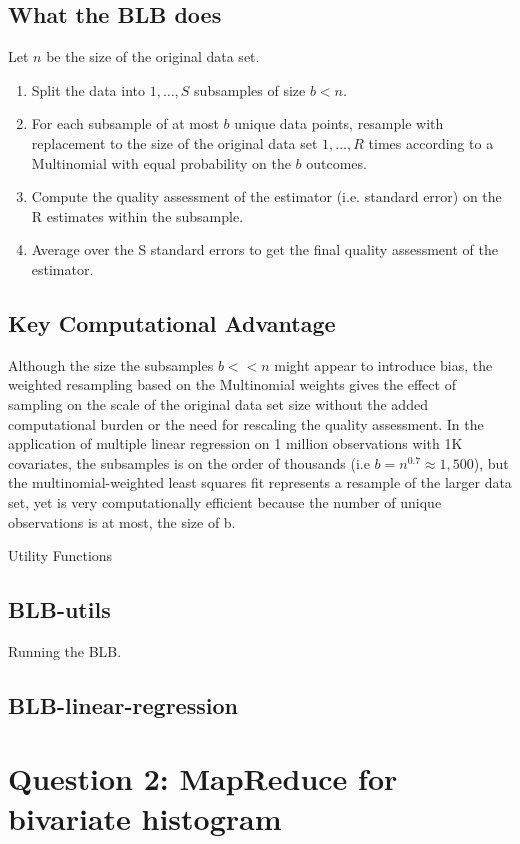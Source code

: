 \documentclass[10pt]{amsart}
\newcommand{\prettycode}[2]{
  \hrulefill
  \subsection*{#1}
  
  \vspace{2em}
}
\begin{document}
\subsection{What the BLB does}

Let $n$ be the size of the original data set. 

\begin{enumerate}
\item Split the data into $1,\dots,S$ subsamples of size $b < n$.
\item For each subsample of at most $b$ unique data points, resample with replacement to the size of the original data set $1,\dots,R$ times according to a Multinomial with equal probability on the $b$ outcomes. 
\item Compute the quality assessment of the estimator (i.e. standard error) on the R estimates within the subsample.
\item Average over the S standard errors to get the final quality assessment of the estimator. 
\end{enumerate}

\subsection{Key Computational Advantage}

Although the size the subsamples $b << n$ might appear to introduce bias, the weighted resampling based on the Multinomial weights gives the effect of sampling on the scale of the original data set size without the added computational burden or the need for rescaling the quality assessment. In the application of multiple linear regression on  1 million observations with 1K covariates, the subsamples is on the order of thousands (i.e $b = n^{0.7} \approx 1,500$), but the multinomial-weighted least squares fit represents a resample of the larger data set, yet is very computationally efficient because the number of unique observations is at most, the size of b. 

Utility Functions
\prettycode{BLB-utils}{../BLB/BLB_utils.R}
Running the BLB.
\prettycode{BLB-linear-regression}{../BLB/BLB_lin_reg_job.R}



\section{Question 2: MapReduce for bivariate histogram}
\end{document}
